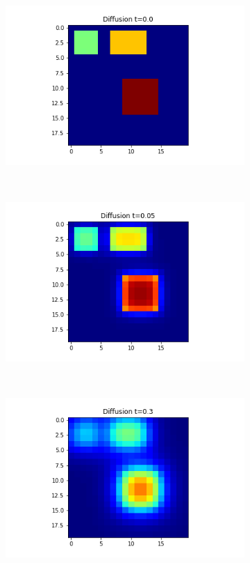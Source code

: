 \documentclass[10pt,a4paper]{article}
\begin{document}
\begin{enumerate}[i)]
\begin{enumerate}[a)]
\begin{figure}[!h]
\begin{subfigure}[b]{0.25\textwidth}
    				\includegraphics[width=\textwidth]{images/mellin-x4-t0.png}
    			\end{subfigure}~
    			\begin{subfigure}[b]{0.25\textwidth}
    				\includegraphics[width= \textwidth]{images/mellin-x4-t05.png}
    			\end{subfigure}~
    			\begin{subfigure}[b]{0.25\textwidth}
    				\includegraphics[width= \textwidth]{images/mellin-x4-t3.png}

\end{subfigure}
\end{figure}
\end{enumerate}
\end{enumerate}
\end{document}
